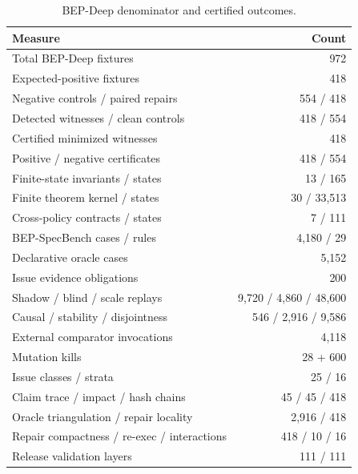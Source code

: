 \begin{table}[t]
\centering
\caption{BEP-Deep denominator and certified outcomes.}
\label{tab:result-overview}
\begin{tabular}{lr}
\toprule
Measure & Count \\
\midrule
Total BEP-Deep fixtures & 972 \\
Expected-positive fixtures & 418 \\
Negative controls / paired repairs & 554 / 418 \\
Detected witnesses / clean controls & 418 / 554 \\
Certified minimized witnesses & 418 \\
Positive / negative certificates & 418 / 554 \\
Finite-state invariants / states & 13 / 165 \\
Finite theorem kernel / states & 30 / 33,513 \\
Cross-policy contracts / states & 7 / 111 \\
BEP-SpecBench cases / rules & 4,180 / 29 \\
Declarative oracle cases & 5,152 \\
Issue evidence obligations & 200 \\
Shadow / blind / scale replays & 9,720 / 4,860 / 48,600 \\
Causal / stability / disjointness & 546 / 2,916 / 9,586 \\
External comparator invocations & 4,118 \\
Mutation kills & 28 + 600 \\
Issue classes / strata & 25 / 16 \\
Claim trace / impact / hash chains & 45 / 45 / 418 \\
Oracle triangulation / repair locality & 2,916 / 418 \\
Repair compactness / re-exec / interactions & 418 / 10 / 16 \\
Release validation layers & 111 / 111 \\
\bottomrule
\end{tabular}
\end{table}
